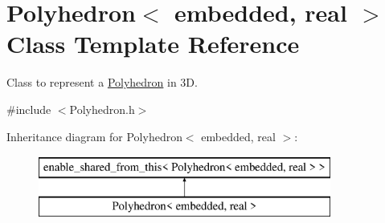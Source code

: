 \hypertarget{class_polyhedron}{}\section{Polyhedron$<$ embedded, real $>$ Class Template Reference}
\label{class_polyhedron}


Class to represent a \hyperlink{class_polyhedron}{Polyhedron} in 3D.  




{\ttfamily \#include $<$Polyhedron.\+h$>$}

Inheritance diagram for Polyhedron$<$ embedded, real $>$\+:\begin{figure}[H]
\begin{center}
\leavevmode
\includegraphics[height=2.000000cm]{class_polyhedron}
\end{center}
\end{figure}
